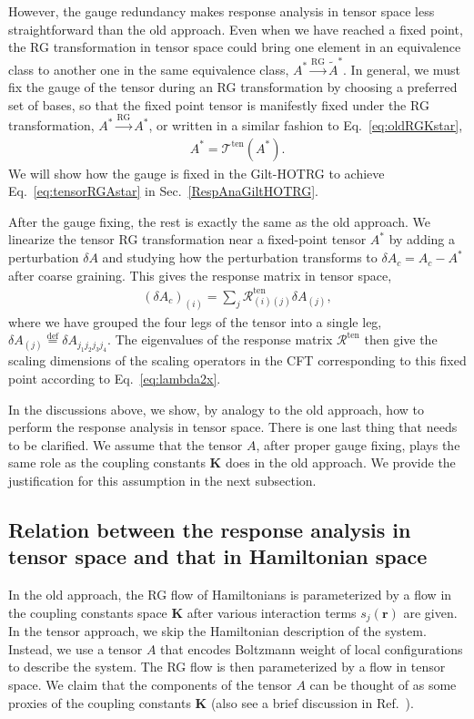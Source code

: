 \documentclass[aps,prb,reprint,superscriptaddress,floatfix]{revtex4-2}
\newcommand{\defeq}{\stackrel{\text{def}}{=}}
\begin{document}
However, the gauge redundancy makes response analysis in tensor space less
straightforward than the old approach. Even when we have reached a fixed
point, the RG transformation in tensor space could bring one element in
an equivalence class to another one in the same equivalence class, $A^*
\xrightarrow{\text{RG}} \tilde{A}^*$. In general, we must fix the gauge
of the tensor during an RG transformation by choosing a preferred set of
bases, so that the fixed point tensor is manifestly fixed under the RG
transformation, $A^* \xrightarrow{\text{RG}} A^*$, or written in a
similar fashion to Eq.~\eqref{eq:oldRGKstar},
%
\begin{align}\label{eq:tensorRGAstar}
    A^* = \mathcal{T}^{\text{ten}}\left(A^* \right).
\end{align}
%
We will show how the gauge is fixed in the Gilt-HOTRG to achieve
Eq.~\eqref{eq:tensorRGAstar} in Sec.~\ref{RespAnaGiltHOTRG}.
%

After the gauge fixing, the rest is exactly the same as the old
approach. We linearize the tensor RG transformation near a fixed-point
tensor $A^*$ by adding a perturbation $\delta A$ and studying how the
perturbation
transforms to $\delta A_c = A_c - A^*$ after coarse graining. This gives the
response matrix in tensor space,
%
\begin{align}\label{eq:respMatTen}
    \left(\delta A_c\right)_{(i)} = \sum_j
    \mathcal{R}^{\text{ten}}_{(i)(j)} \delta A_{(j)},
\end{align}
%
where we have grouped the four legs of the tensor into a single leg,
$\delta A_{(j)} \defeq \delta A_{j_1 j_2 j_3 j_4}$. The eigenvalues of
the response matrix $\mathcal{R}^{\text{ten}}$ then give the scaling
dimensions of the scaling operators in the CFT corresponding to this
fixed point according to Eq.~\eqref{eq:lambda2x}.
%

In the discussions above, we show, by analogy to the old approach, how
to perform the response analysis in tensor space. There is one last thing
that needs to be clarified. We assume that the tensor $A$, after proper
gauge fixing, plays the same role as the coupling constants
$\mathbf{K}$ does in the old approach. We provide the justification for
this assumption in the next subsection.
%


\subsection{Relation between the response analysis in tensor space and that
in Hamiltonian space\label{relateTensorCoupling}}
In the old approach, the RG flow of Hamiltonians is parameterized by a
flow in the coupling constants space $\mathbf{K}$ after various interaction
terms $s_j(\mathbf{r})$ are given. In the tensor approach, we skip the
Hamiltonian description of the system. Instead, we use a tensor $A$
that encodes Boltzmann weight of local configurations to describe the
system. The RG flow is then parameterized by a flow in tensor space. We
claim that the components of the tensor $A$ can be thought of as some
proxies of the coupling constants $\mathbf{K}$ (also see a brief
discussion in Ref.~\cite{GuWen2009}).
%
\end{document}
